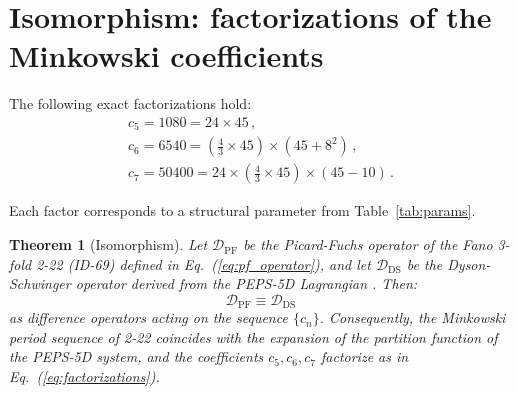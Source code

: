 \documentclass[12pt]{article}
\newtheorem{theorem}{Theorem}
\begin{document}
\section{Isomorphism: factorizations of the Minkowski coefficients}

The following exact factorizations hold:
\begin{equation}
\begin{aligned}
\boxed{c_5 = 1080 = 24 \times 45} \,, \\
\boxed{c_6 = 6540 = \left(\frac{4}{3} \times 45\right) \times \left(45 + 8^2\right)} \,, \\
\boxed{c_7 = 50400 = 24 \times \left(\frac{4}{3} \times 45\right) \times \left(45 - 10\right)} \, .
\end{aligned}
\label{eq:factorizations}
\end{equation}

Each factor corresponds to a structural parameter from Table~\ref{tab:params}.

\begin{theorem}[Isomorphism]
Let $\mathcal{D}_{\text{PF}}$ be the Picard-Fuchs operator of the Fano 3-fold
2-22 (ID-69) defined in Eq.~(\ref{eq:pf_operator}), and let $\mathcal{D}_{\text{DS}}$
be the Dyson-Schwinger operator derived from the PEPS-5D Lagrangian \cite{peps5d}.
Then:
\[
\mathcal{D}_{\text{PF}} \equiv \mathcal{D}_{\text{DS}}
\]
as difference operators acting on the sequence $\{c_n\}$. Consequently, the
Minkowski period sequence of 2-22 coincides with the expansion of the
partition function of the PEPS-5D system, and the coefficients $c_5, c_6, c_7$
factorize as in Eq.~(\ref{eq:factorizations}).
\end{theorem}
\end{document}
